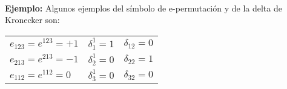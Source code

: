 \noindent{}
\\[1em]
\noindent
\textbf{Ejemplo: } Algunos ejemplos del símbolo de e-permutación y de la delta de Kronecker son:
\begin{table}[H]
\large
\centering
\begin{tabular}{l c c}
$e_{123} = e^{123} = +1$ & $\delta_{1}^{1} =  1$ & $\delta_{12} = 0$ \\
$e_{213} = e^{213} = -1$ & $\delta_{2}^{1} =  0$ & $\delta_{22} = 1$ \\
$e_{112} = e^{112} = 0$ & $\delta_{3}^{1} =  0$ & $\delta_{32} = 0$
\end{tabular}
\end{table}

